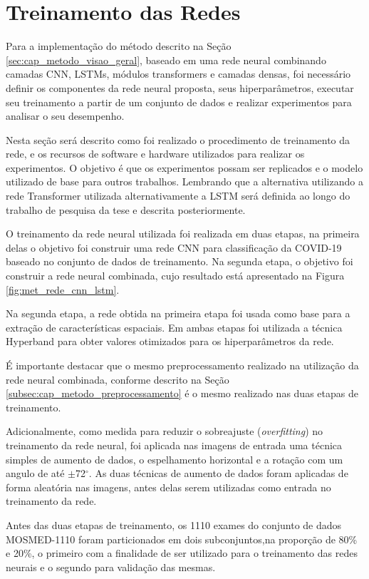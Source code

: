 \section{Treinamento das Redes}\label{sec:cap_metodo_treinamento_redes}

Para a implementação do método descrito na Seção \ref{sec:cap_metodo_visao_geral}, baseado em uma rede neural combinando camadas CNN, LSTMs, módulos transformers e camadas densas, foi necessário definir os componentes da rede neural proposta, seus hiperparâmetros, executar seu treinamento a partir de um conjunto de dados e realizar experimentos para analisar o seu desempenho.

Nesta seção será descrito como foi realizado o procedimento de treinamento da rede, e os recursos de software e hardware utilizados para realizar os experimentos. O objetivo é que os experimentos possam ser replicados e o modelo utilizado de base para outros trabalhos. Lembrando que a alternativa utilizando a rede Transformer utilizada alternativamente a LSTM será definida ao longo do trabalho de pesquisa da tese e descrita posteriormente.

O treinamento da rede neural utilizada foi realizada em duas etapas, na primeira delas o objetivo foi construir uma rede CNN para classificação da COVID-19 baseado no conjunto de dados de treinamento. Na segunda etapa, o objetivo foi construir a rede neural combinada, cujo resultado está apresentado na Figura \ref{fig:met_rede_cnn_lstm}. 

Na segunda etapa, a rede obtida na primeira etapa foi usada como base para a extração de características espaciais. Em ambas etapas foi utilizada a técnica Hyperband \cite{Li2017} para obter valores otimizados para os hiperparâmetros da rede.

É importante destacar que o mesmo preprocessamento realizado na utilização da rede neural combinada, conforme descrito na Seção \ref{subsec:cap_metodo_preprocessamento} é o mesmo realizado nas duas etapas de treinamento.

Adicionalmente, como medida para reduzir o sobreajuste (\textit{overfitting}) no treinamento da rede neural, foi aplicada nas imagens de entrada uma técnica simples de aumento de dados, o espelhamento horizontal e a rotação com um angulo de até ${\pm}$72$^{\circ}$. As duas técnicas de aumento de dados foram aplicadas de forma aleatória nas imagens, antes delas serem utilizadas como entrada no treinamento da rede.

Antes das duas etapas de treinamento, os 1110 exames do conjunto de dados MOSMED-1110 foram particionados em dois subconjuntos,na proporção de 80\% e 20\%, o primeiro com a finalidade de ser utilizado para o treinamento das redes neurais e o segundo para validação das mesmas.

